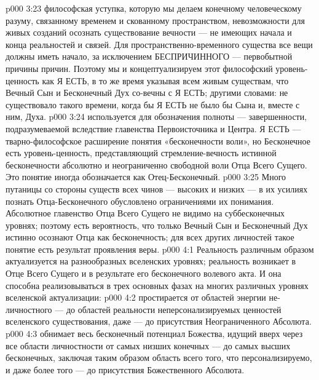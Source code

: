 \vs p000 3:23 \pc {} философская уступка, которую мы делаем конечному человеческому разуму, связанному временем и скованному пространством, невозможности для живых созданий осознать существование вечности --- не имеющих начала и конца реальностей и связей. Для пространственно\hyp{}временного существа все вещи должны иметь начало, за исключением БЕСПРИЧИННОГО --- первобытной причины причин. Поэтому мы и концептуализируем этот философский уровень\hyp{}ценность как Я ЕСТЬ, в то же время указывая всем живым существам, что Вечный Сын и Бесконечный Дух со\hyp{}вечны с Я ЕСТЬ; другими словами: не существовало такого времени, когда бы Я ЕСТЬ не было бы  Сына и, вместе с ним, Духа.
\vs p000 3:24 \pc {} используется для обозначения полноты --- завершенности, подразумеваемой вследствие главенства Первоисточника и Центра.  Я ЕСТЬ --- тварно\hyp{}философское расширение понятия «бесконечности воли», но Бесконечное есть  уровень\hyp{}ценность, представляющий стремление\hyp{}вечность истинной бесконечности абсолютно и неограниченно свободной воли Отца Всего Сущего. Это понятие иногда обозначается как Отец\hyp{}Бесконечный.
\vs p000 3:25 Много путаницы со стороны существ всех чинов --- высоких и низких --- в их усилиях познать Отца\hyp{}Бесконечного обусловлено ограничениями их понимания. Абсолютное главенство Отца Всего Сущего не видимо на суббесконечных уровнях; поэтому есть вероятность, что только Вечный Сын и Бесконечный Дух истинно осознают Отца как бесконечность; для всех других личностей такое понятие есть результат проявления веры.
\vs p000 4:1 Реальность различным образом актуализуется на разнообразных вселенских уровнях; реальность возникает в Отце Всего Сущего и в результате его бесконечного волевого акта. И она способна реализовываться в трех основных фазах на многих различных уровнях вселенской актуализации:
\vs p000 4:2 \bibnobreakspace {} простирается от областей энергии не\hyp{}личностного --- до областей реальности неперсонализируемых ценностей вселенского существования, даже --- до присутствия Неограниченного Абсолюта.
\vs p000 4:3 \bibnobreakspace {} обнимает весь бесконечный потенциал Божества, идущий вверх через все области личностности от самых низших конечных --- до самых высших бесконечных, заключая таким образом область всего того, что персонализируемо, и даже более того --- до присутствия Божественного Абсолюта.
